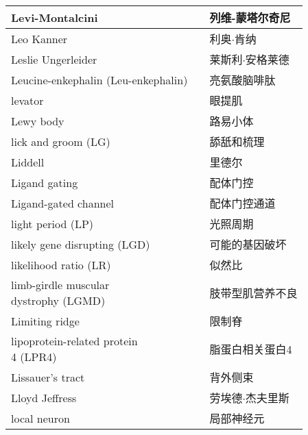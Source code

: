 \begin{longtable}{lll}
	\midrule
	Levi-Montalcini   && 列维-蒙塔尔奇尼  \\
	
	\midrule
	Leo Kanner   && 利奥$\cdot$肯纳  \\
	
	\midrule
	Leslie Ungerleider   && 莱斯利$\cdot$安格莱德  \\
	
	\midrule
	Leucine-enkephalin (Leu-enkephalin)   && 亮氨酸脑啡肽  \\
	
	\midrule
	levator   && 眼提肌  \\
	
	\midrule
	Lewy body   && 路易小体  \\
	
	\midrule
	lick and groom (LG)  && 舔舐和梳理  \\
	
	\midrule
	Liddell  && 里德尔  \\
	
	\midrule
	Ligand gating  && 配体门控  \\
	
	\midrule
	Ligand-gated channel  && 配体门控通道  \\
	
	\midrule
	light period (LP)  && 光照周期  \\
	
	\midrule
	likely gene disrupting (LGD)  && 可能的基因破坏  \\
	
	\midrule
	likelihood ratio (LR) && 似然比  \\
	
	\midrule
	\makecell[l]{limb-girdle muscular \\dystrophy (LGMD)} && 肢带型肌营养不良  \\
	
	\midrule
	Limiting ridge && 限制脊  \\
	
	\midrule
	\makecell[l]{lipoprotein-related protein \\ 4 (LPR4)} && 脂蛋白相关蛋白4  \\
	
	\midrule
	Lissauer’s tract  && 背外侧束  \\
	
	\midrule
	Lloyd Jeffress  && 劳埃德$\cdot$杰夫里斯  \\
	
	\midrule
	local neuron  && 局部神经元  \\
	

\end{longtable}
